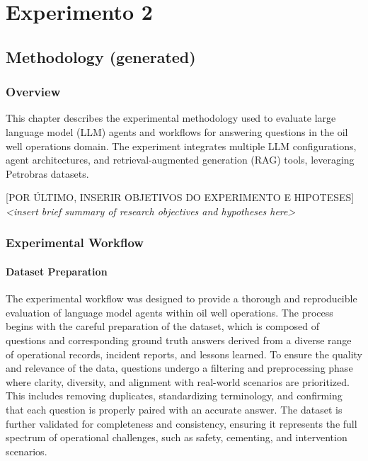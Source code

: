 
\chapter{Experimento 2}
    

    \section{Methodology (generated)}

        \subsection{Overview}

            This chapter describes the experimental methodology used to evaluate large language model (LLM) agents and workflows for answering questions in the oil well operations domain. The experiment integrates multiple LLM configurations, agent architectures, and retrieval-augmented generation (RAG) tools, leveraging Petrobras datasets.

            [POR ÚLTIMO, INSERIR OBJETIVOS DO EXPERIMENTO E HIPOTESES]
            \textit{<insert brief summary of research objectives and hypotheses here>}

        \subsection{Experimental Workflow}

            \subsubsection{Dataset Preparation}

                The experimental workflow was designed to provide a thorough and reproducible evaluation of language model agents within oil well operations. The process begins with the careful preparation of the dataset, which is composed of questions and corresponding ground truth answers derived from a diverse range of operational records, incident reports, and lessons learned. To ensure the quality and relevance of the data, questions undergo a filtering and preprocessing phase where clarity, diversity, and alignment with real-world scenarios are prioritized. This includes removing duplicates, standardizing terminology, and confirming that each question is properly paired with an accurate answer. The dataset is further validated for completeness and consistency, ensuring it represents the full spectrum of operational challenges, such as safety, cementing, and intervention scenarios.

